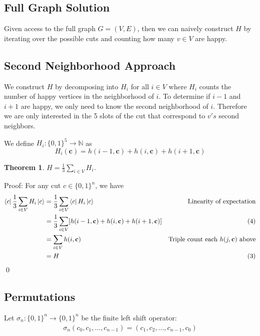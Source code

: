 \documentclass[10pt]{article}
\newtheorem{theorem}{Theorem}
\begin{document}
\subsection*{Full Graph Solution}
Given access to the full graph $G = (V,E)$, then we can naively construct $H$ by iterating over the possible cuts and counting how many $v \in V$ are happy.

\subsection*{Second Neighborhood Approach}
We construct $H$ by decomposing into $H_i$ for all $i \in V$ where $H_i$ counts the number of happy vertices in the neighborhood of $i$. To determine if $i - 1$ and $i+1$ are happy, we only need to know the second neighborhood of $i$. Therefore we are only interested in the 5 slots of the cut that correspond to $v's$ second neighbors.

We define $H_i : \{0,1\}^5 \rightarrow \mathbb{N}$ as
\begin{equation}
    H_i(\mathbf{c}) = h(i-1, \mathbf{c}) + h(i,\mathbf{c}) + h(i+1, \mathbf{c})
\end{equation}


\begin{theorem}
    $H = \frac{1}{3}\sum_{i \in V} H_i$.
\end{theorem}

\noindent Proof: For any cut $c \in \{0,1\}^n$, we have
\begin{align*}
    \bra{c}\frac{1}{3}\sum_{i \in V} H_i \ket{c} &= \frac{1}{3}\sum_{i \in V}\bra{c} H_i \ket{c} &\text{Linearity of expectation} \\
    & = \frac{1}{3}\sum_{i \in V}[h(i-1, \mathbf{c}) + h(i,\mathbf{c}) + h(i+1, \mathbf{c})] &\text{(4)} \\
    &= \sum_{i \in V} h(i, \mathbf{c}) &\text{Triple count each $h(j,\textbf{c})$ above} \\
    &= H &\text{(3)}
\end{align*}
\qed

\subsection*{Permutations}
Let $\sigma_n : \{0,1\}^n \rightarrow \{0,1\}^n$ be the finite left shift operator:
\begin{align}
    \sigma_n(c_0, c_1, \dots, c_{n-1}) = (c_1, c_2,\dots, c_{n-1}, c_0)
\end{align}
\end{document}
